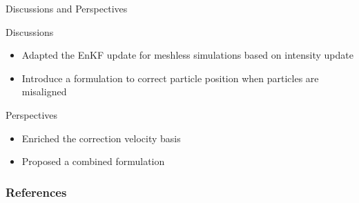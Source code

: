 \documentclass[aspectratio=169]{beamer} %
\begin{document}
\begin{frame}{Discussions and Perspectives}

    \begin{block}{Discussions}
        \begin{itemize}
            \item Adapted the EnKF update for meshless simulations based on intensity update
            \item Introduce a formulation to correct particle position when particles are misaligned
        \end{itemize}
    \end{block}

    \begin{block}{Perspectives}
        \begin{itemize}
            \item Enriched the correction velocity basis
            \item Proposed a combined formulation
        \end{itemize}
    \end{block}
\end{frame}

\closingframe

\begin{frame}
    \frametitle{References}
    \printbibliography %
\end{frame}

\end{document}
